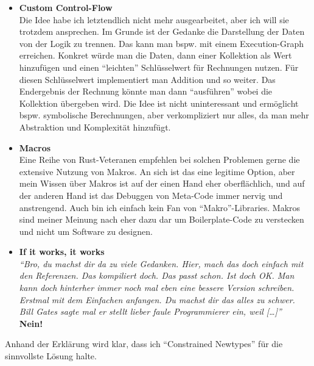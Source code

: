 \documentclass[12pt]{article}
\begin{document}
\begin{itemize}
\begin{lstlisting}[language=Rust, numbers=left, morekeywords={GenGroup, Group, T}]
impl<T: GenGroup> Add<Group<T>> for Group<T> {
	type Output = Group<T>;
	
	fn add(self, rhs: Self) -> Group<T> {
		Group(self.0.add(rhs.0))
	}
}

impl<T: GenGroup> Add<&Group<T>> for Group<T> {
	type Output = Group<T>;
	
	fn add(self, rhs: &Self) -> Self {
		Group(self.0.add_ref(&rhs.0))
	}
}

%*$\dots$*)
\end{lstlisting}
\item \textbf{Custom Control-Flow}\\
Die Idee habe ich letztendlich nicht mehr ausgearbeitet, aber ich will sie trotzdem ansprechen. Im Grunde ist der Gedanke die Darstellung der Daten von der Logik zu trennen. Das kann man bspw. mit einem Execution-Graph erreichen. Konkret würde man die Daten, dann einer Kollektion als Wert hinzufügen und einen ``leichten'' Schlüsselwert für Rechnungen nutzen. Für diesen Schlüsselwert implementiert man Addition und so weiter. Das Endergebnis der Rechnung könnte man dann ``ausführen'' wobei die Kollektion übergeben wird. Die Idee ist nicht uninteressant und ermöglicht bspw. symbolische Berechnungen, aber verkompliziert nur alles, da man mehr Abstraktion und Komplexität hinzufügt.
\item \textbf{Macros}\\
Eine Reihe von Rust-Veteranen empfehlen bei solchen Problemen gerne die extensive Nutzung von Makros. An sich ist das eine legitime Option, aber mein Wissen über Makros ist auf der einen Hand eher oberflächlich, und auf der anderen Hand ist das Debuggen von Meta-Code immer nervig und anstrengend. Auch bin ich einfach kein Fan von ``Makro''-Libraries. Makros sind meiner Meinung nach eher dazu dar um Boilerplate-Code zu verstecken und nicht um Software zu designen.
\item \textbf{If it works, it works}\\
\textit{``Bro, du machst dir da zu viele Gedanken. Hier, mach das doch einfach mit den Referenzen. Das kompiliert doch. Das passt schon. Ist doch OK. Man kann doch hinterher immer noch mal eben eine bessere Version schreiben. Erstmal mit dem Einfachen anfangen. Du machst dir das alles zu schwer. Bill Gates sagte mal er stellt lieber faule Programmierer ein, weil [\dots]''}\\
\textbf{Nein!}
\end{itemize}
Anhand der Erklärung wird klar, dass ich ``Constrained Newtypes'' für die sinnvollste Lösung halte.

%
%
%
%
%



\end{document}
